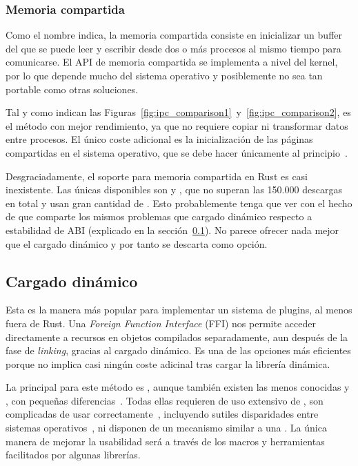 \subsubsection{Memoria compartida}

Como el nombre indica, la memoria compartida consiste en inicializar un buffer
del que se puede leer y escribir desde dos o más procesos al mismo tiempo para
comunicarse. El API de memoria compartida se implementa a nivel del kernel, por
lo que depende mucho del sistema operativo y posiblemente no sea tan portable
como otras soluciones.

Tal y como indican las
Figuras~\ref{fig:ipc_comparison1}~y~\ref{fig:ipc_comparison2}, es el método con
mejor rendimiento, ya que no requiere copiar ni transformar datos entre
procesos. El único coste adicional es la inicialización de las páginas
compartidas en el sistema operativo, que se debe hacer únicamente al
principio~\cite{sharedmemperf}.

Desgraciadamente, el soporte para memoria compartida en Rust es casi
inexistente. Las únicas \crates disponibles son  y
, que no superan las 150.000 descargas en total y usan gran
cantidad de \unsafe. Esto probablemente tenga que ver con el hecho de que
comparte los mismos problemas que cargado dinámico respecto a estabilidad de ABI
(explicado en la sección~\ref{sec:dynload}). No parece ofrecer nada mejor que el
cargado dinámico y por tanto se descarta como opción.

\subsection{Cargado dinámico}\label{sec:dynload}

Esta es la manera más popular para implementar un sistema de plugins, al menos
fuera de Rust. Una \emph{Foreign Function Interface} (FFI) nos permite acceder
directamente a recursos en objetos compilados separadamente, aun después de la
fase de \emph{linking}, gracias al cargado dinámico. Es una de las opciones más
eficientes porque no implica casi ningún coste adicinal tras cargar la librería
dinámica.

La \crate principal para este método es , aunque también
existen las menos conocidas  y , con pequeñas
diferencias~\cite{cratesdynloadcompare}. Todas ellas requieren de uso extensivo
de \unsafe, son complicadas de usar
correctamente~\cite{hardplugins1}\cite{hardplugins2}, incluyendo sutiles
disparidades entre sistemas operativos~\cite{hardplugins3}, ni disponen de un
mecanismo similar a una \sandbox. La única manera de mejorar la usabilidad será
a través de los macros y herramientas facilitados por algunas librerías.

